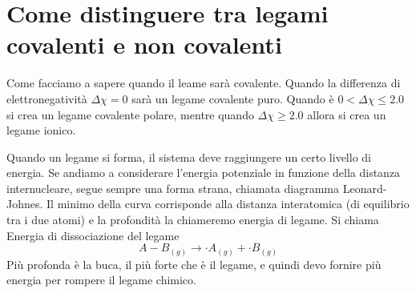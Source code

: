 \documentclass[a4paper]{article}
\begin{document}
\section{Come distinguere tra legami covalenti e non covalenti}
Come facciamo a sapere quando il leame sarà covalente. Quando la differenza di elettronegatività $\Delta \chi = 0$ sarà un legame covalente puro. Quando è $0<\Delta \chi \leq 2.0$ si crea un legame covalente polare, mentre quando $\Delta \chi \geq 2.0$ allora si crea un legame ionico. 

Quando un legame si forma, il sistema deve raggiungere un certo livello di energia. Se andiamo a considerare l'energia potenziale in funzione della distanza internucleare, segue sempre una forma strana, chiamata diagramma Leonard-Johnes. Il minimo della curva corrisponde alla distanza interatomica (di equilibrio tra i due atomi) e la profondità la chiameremo energia di legame. Si chiama Energia di dissociazione del legame
\begin{equation*}
    A - B_(g) \rightarrow \cdot A_{(g)} + \cdot B_{(g)}
\end{equation*}
Più profonda è la buca, il più forte che è il legame, e quindi devo fornire più energia per rompere il legame chimico. 
\end{document}
